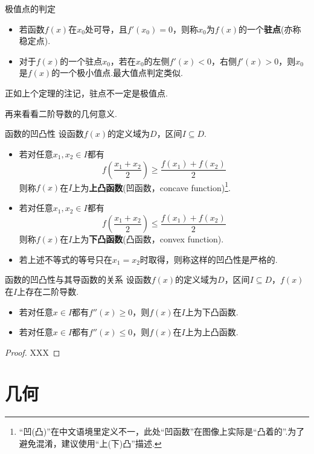 \documentclass[lang=cn, zihao=5]{elegantbook}
\newcommand{\ssb}[1]{\left( #1 \right)}
\begin{document}
\begin{theorem}{极值点的判定}
	\begin{itemize}
		\item 若函数$f(x)$在$x_0$处可导，且$f'(x_0)=0$，则称$x_0$为$f(x)$的一个\textbf{驻点}(亦称稳定点).
		\item 对于$f(x)$的一个驻点$x_0$，若在$x_0$的左侧$f'(x)<0$，右侧$f'(x)>0$，则$x_0$是$f(x)$的一个极小值点.最大值点判定类似.
	\end{itemize}
\end{theorem}
\begin{remark}
	正如上个定理的注记，驻点不一定是极值点.
\end{remark}

再来看看二阶导数的几何意义.

\begin{definition}{函数的凹凸性}
	设函数$f(x)$的定义域为$D$，区间$I \subseteq D$.
	\begin{itemize}
		\item 若对任意$x_1,x_2 \in I$都有$$f\ssb{\frac{x_1+x_2}{2}} \geq \frac{f(x_1)+f(x_2)}{2}$$则称$f(x)$在$I$上为\textbf{上凸函数}(凹函数，concave function)\footnote{“凹(凸)”在中文语境里定义不一，此处“凹函数”在图像上实际是“凸着的”.为了避免混淆，建议使用“上(下)凸”描述.}.
		\item 若对任意$x_1,x_2 \in I$都有$$f\ssb{\frac{x_1+x_2}{2}} \leq \frac{f(x_1)+f(x_2)}{2}$$则称$f(x)$在$I$上为\textbf{下凸函数}(凸函数，convex function).
		\item 若上述不等式的等号只在$x_1=x_2$时取得，则称这样的凹凸性是严格的.
	\end{itemize}
\end{definition}

\begin{theorem}{函数的凹凸性与其导函数的关系}
	设函数$f(x)$的定义域为$D$，区间$I \subseteq D$，$f(x)$在$I$上存在二阶导数.
	\begin{itemize}
		\item 若对任意$x \in I$都有$f''(x) \geq 0$，则$f(x)$在$I$上为下凸函数.
		\item 若对任意$x \in I$都有$f''(x) \leq 0$，则$f(x)$在$I$上为上凸函数.
	\end{itemize}
\end{theorem}
\begin{proof}
	XXX
\end{proof}

\part{几何}
\end{document}

